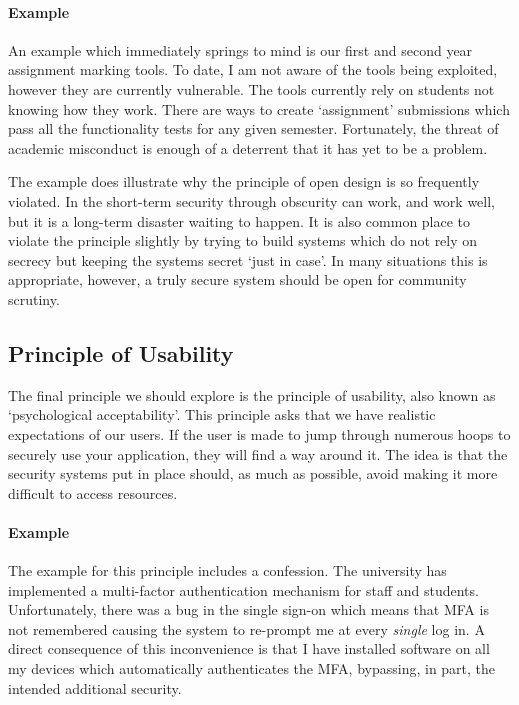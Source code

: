 \paragraph{Example}
An example which immediately springs to mind is our first and second year assignment marking tools.
To date, I am not aware of the tools being exploited, however they are currently vulnerable.
The tools currently rely on students not knowing how they work.
There are ways to create `assignment' submissions which pass all the functionality tests for any given semester.
Fortunately, the threat of academic misconduct is enough of a deterrent that it has yet to be a problem.

The example does illustrate why the principle of open design is so frequently violated.
In the short-term security through obscurity can work, and work well, but it is a long-term disaster waiting to happen.
It is also common place to violate the principle slightly by trying to build systems which do not rely on secrecy but keeping the systems secret `just in case'.
In many situations this is appropriate, however, a truly secure system should be open for community scrutiny.

\subsection{Principle of Usability}

\noindent
The final principle we should explore is the principle of usability, also known as `psychological acceptability'.
This principle asks that we have realistic expectations of our users.
If the user is made to jump through numerous hoops to securely use your application, they will find a way around it.
The idea is that the security systems put in place should, as much as possible, avoid making it more difficult to access resources.

\paragraph{Example}
The example for this principle includes a confession.
The university has implemented a multi-factor authentication mechanism for staff and students.
Unfortunately, there was a bug in the single sign-on which means that MFA is not remembered causing the system to re-prompt me at every \textsl{single} log in.
A direct consequence of this inconvenience is that I have installed software on all my devices which automatically authenticates the MFA,
bypassing, in part, the intended additional security.

